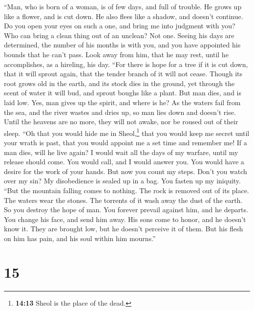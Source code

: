  ``Man, who is born of a woman, is of few days, and full
of trouble.  He grows up like a flower, and is cut down.
He also flees like a shadow, and doesn't continue.  Do you
open your eyes on such a one, and bring me into judgment with you?
 Who can bring a clean thing out of an unclean? Not one.
 Seeing his days are determined, the number of his months
is with you, and you have appointed his bounds that he can't pass.
 Look away from him, that he may rest, until he
accomplishes, as a hireling, his day.  ``For there is hope
for a tree if it is cut down, that it will sprout again, that the tender
branch of it will not cease.  Though its root grows old in
the earth, and its stock dies in the ground,  yet through
the scent of water it will bud, and sprout boughs like a plant.
 But man dies, and is laid low. Yes, man gives up the
spirit, and where is he?  As the waters fail from the
sea, and the river wastes and dries up,  so man lies down
and doesn't rise. Until the heavens are no more, they will not awake,
nor be roused out of their sleep.  ``Oh that you would
hide me in Sheol,\footnote{\textbf{14:13} Sheol is the place of the
  dead.} that you would keep me secret until your wrath is past, that
you would appoint me a set time and remember me!  If a
man dies, will he live again? I would wait all the days of my warfare,
until my release should come.  You would call, and I
would answer you. You would have a desire for the work of your hands.
 But now you count my steps. Don't you watch over my sin?
 My disobedience is sealed up in a bag. You fasten up my
iniquity.  ``But the mountain falling comes to nothing.
The rock is removed out of its place.  The waters wear
the stones. The torrents of it wash away the dust of the earth. So you
destroy the hope of man.  You forever prevail against
him, and he departs. You change his face, and send him away.
 His sons come to honor, and he doesn't know it. They are
brought low, but he doesn't perceive it of them.  But his
flesh on him has pain, and his soul within him mourns.''

\hypertarget{section-14}{%
\section{15}\label{section-14}}

